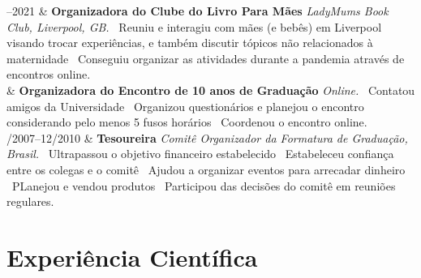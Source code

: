 \documentclass[11pt, a4paper]{article}
\newcommand{\Duration}[2]{\fontsize{10pt}{0}\selectfont #1--#2}
\newcommand{\Year}[1]{\fontsize{10pt}{0}\selectfont #1}
\begin{document}
\begin{EntriesTable}
	\Duration{2020}{2021}  &
	\textbf{Organizadora do Clube do Livro Para Mães}
	\newline
	\textit{ LadyMums Book Club, Liverpool, GB.}
	\newline
	\textbullet \ Reuniu e interagiu com mães (e bebês) em Liverpool visando
	trocar experiências, e também discutir tópicos não relacionados à maternidade
	\textbullet \ Conseguiu organizar as atividades durante a pandemia 
	através de encontros online.
	\\
	\Year{2020}  &
	\textbf{Organizadora do Encontro de 10 anos de Graduação}
	\newline
	\textit{ Online.}
	\newline
	\textbullet \ Contatou amigos da Universidade
	\textbullet \ Organizou questionários e planejou o encontro
	considerando pelo menos 5 fusos horários
	\textbullet \ Coordenou o encontro online.
	\\
	\Duration{04/2007}{12/2010}  &
	\textbf{Tesoureira}
	\newline
	\textit{ Comitê Organizador da Formatura de Graduação, Brasil.}
	\newline
	\textbullet \ Ultrapassou o objetivo financeiro estabelecido
	\textbullet \ Estabeleceu confiança entre os colegas e o comitê
	\textbullet \ Ajudou a organizar eventos para arrecadar dinheiro
	\textbullet \ PLanejou e vendou produtos
	\textbullet \ Participou das decisões do comitê em reuniões regulares.

\end{EntriesTable}

\section*{Experiência Científica}
\end{document}
